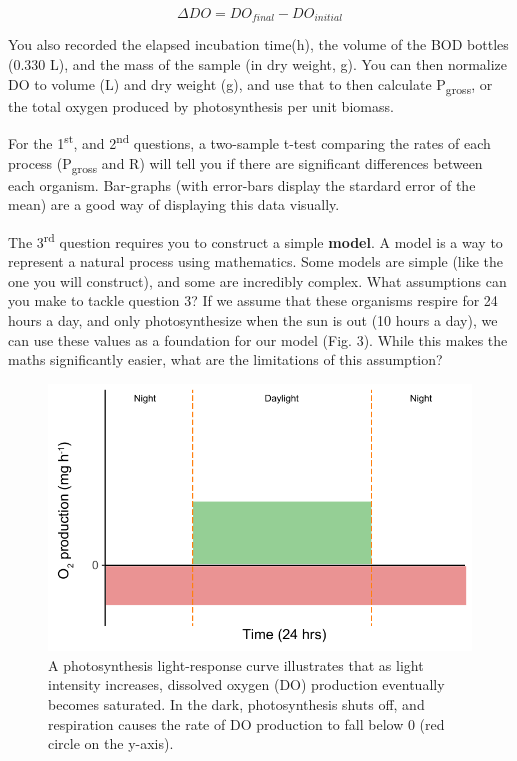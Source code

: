 \documentclass[11pt,]{article}
\begin{document}
\begin{equation}
\Delta{}DO = DO_{final} - DO_{initial}
\end{equation}

You also recorded the elapsed incubation time(\textDelta{}h), the volume
of the BOD bottles (0.330 L), and the mass of the sample (in dry weight,
g). You can then normalize \textDelta{}DO to volume (L) and dry weight
(g), and use that to then calculate P\textsubscript{gross}, or the total
oxygen produced by photosynthesis per unit biomass.

For the 1\textsuperscript{st}, and 2\textsuperscript{nd} questions, a
two-sample t-test comparing the rates of each process
(P\textsubscript{gross} and R) will tell you if there are significant
differences between each organism. Bar-graphs (with error-bars display
the stardard error of the mean) are a good way of displaying this data
visually.

The 3\textsuperscript{rd} question requires you to construct a simple
\textbf{model}. A model is a way to represent a natural process using
mathematics. Some models are simple (like the one you will construct),
and some are incredibly complex. What assumptions can you make to tackle
question 3? If we assume that these organisms respire for 24 hours a
day, and only photosynthesize when the sun is out (10 hours a day), we
can use these values as a foundation for our model (Fig. 3). While this
makes the maths significantly easier, what are the limitations of this
assumption?

\begin{figure}
\centering
\includegraphics{../_chapter_materials/photo_model.pdf}
\caption{A photosynthesis light-response curve illustrates that as light
intensity increases, dissolved oxygen (DO) production eventually becomes
saturated. In the dark, photosynthesis shuts off, and respiration causes
the rate of DO production to fall below 0 (red circle on the y-axis).}
\end{figure}
\end{document}
